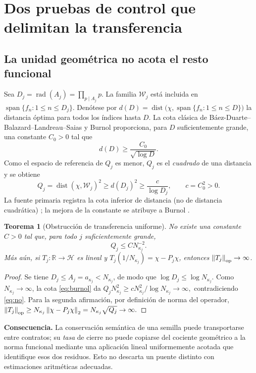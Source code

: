 \documentclass[11pt,a4paper]{article}
\theoremstyle{mine}
\newtheorem{teorema}{Teorema}[section]
\theoremstyle{definition}
\newcommand{\HH}{\mathcal H}
\newcommand{\WW}{\mathcal W}
\newcommand{\RR}{\mathbb R}
\newcommand{\norm}[1]{\left\lVert#1\right\rVert}
\newcommand{\rad}{\operatorname{rad}}
\newcommand{\dist}{\operatorname{dist}}
\begin{document}
\section{Dos pruebas de control que delimitan la transferencia}

\subsection{La unidad geométrica no acota el resto funcional}

Sea $D_j=\rad(A_j)=\prod_{p\mid A_j}p$. La familia $\WW_j$ está incluida en $\operatorname{span}\{f_n:1\le n\le D_j\}$. Denótese por
$d(D)=\dist\bigl(\chi,\operatorname{span}\{f_n:1\le n\le D\}\bigr)$
la distancia óptima para todos los índices hasta $D$. La cota clásica de Báez-Duarte--Balazard--Landreau--Saias y Burnol proporciona, para $D$ suficientemente grande, una constante $C_0>0$ tal que
\[
d(D)\ge\frac{C_0}{\sqrt{\log D}}.
\]
Como el espacio de referencia de $Q_j$ es menor, $Q_j$ es el \emph{cuadrado} de una distancia y se obtiene
\begin{equation}\label{eq:burnol}
Q_j=\dist(\chi,\WW_j)^2\ge d(D_j)^2\ge \frac{c}{\log D_j},\qquad c=C_0^2>0.
\end{equation}
La fuente primaria registra la cota inferior de distancia (no de distancia cuadrática) \cite[§1, ec.~(1.2)]{BD2003}; la mejora de la constante se atribuye a Burnol \cite{Burnol}.

\begin{teorema}[Obstrucción de transferencia uniforme]\label{th:nogo}
No existe una constante $C>0$ tal que, para todo $j$ suficientemente grande,
\begin{equation}\label{eq:no}\boxed{Q_j\le C N_{\kappa_j}^{-2}.}\end{equation}
Más aún, si $T_j:\RR\to\HH$ es lineal y $T_j(1/N_{\kappa_j})=\chi-P_j\chi$, entonces $\norm{T_j}_{\rm op}\to\infty$.
\end{teorema}
\begin{proof}
Se tiene $D_j\le A_j=a_{\kappa_j}<N_{\kappa_j}$, de modo que $\log D_j\le\log N_{\kappa_j}$. Como $N_{\kappa_j}\to\infty$, la cota \eqref{eq:burnol} da
\(
Q_jN_{\kappa_j}^2\ge cN_{\kappa_j}^2/\log N_{\kappa_j}\to\infty,
\)
contradiciendo \eqref{eq:no}. Para la segunda afirmación, por definición de norma del operador,
\(
\norm{T_j}_{\rm op}\ge N_{\kappa_j}\norm{\chi-P_j\chi}_2=N_{\kappa_j}\sqrt{Q_j}
\to\infty.
\)
\end{proof}

\textbf{Consecuencia.} La conservación semántica de una semilla puede transportarse entre contratos; su \emph{tasa} de cierre no puede copiarse del cociente geométrico a la norma funcional mediante una aplicación lineal uniformemente acotada que identifique esos dos residuos. Esto no descarta un puente distinto con estimaciones aritméticas adecuadas.
\end{document}
